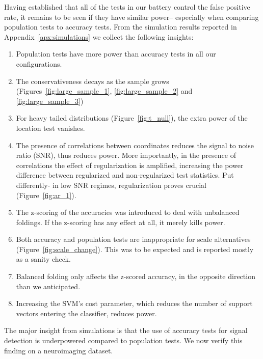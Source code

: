 \documentclass[12pt,a4paper]{article}
\theoremstyle{definition}
\begin{document}
Having established that all of the tests in our battery control the false positive rate, it remains to be seen if they have similar power-- 
especially when comparing population tests to accuracy tests. 
From the simulation results reported in Appendix~\ref{apx:simulations} we collect the following insights:
\begin{enumerate}
\item Population tests have more power than accuracy tests in all our configurations.

\item The conservativeness decays as the sample grows (Figures~\ref{fig:large_sample_1}, \ref{fig:large_sample_2} and \ref{fig:large_sample_3})

\item For heavy tailed distributions (Figure~\ref{fig:t_null}), the extra power of the location test vanishes. 

\item The presence of correlations between coordinates reduces the signal to noise ratio (SNR), thus reduces power. 
More importantly, in the presence of correlations the effect of regularization is amplified, increasing the power difference between regularized and non-regularized test statistics.
Put differently- in low SNR regimes, regularization proves crucial (Figure~\ref{fig:ar_1}).

\item The z-scoring of the accuracies was introduced to deal with unbalanced foldings. 
If the z-scoring has any effect at all, it merely kills power.

\item Both accuracy and population tests are inappropriate for scale alternatives (Figure~\ref{fig:scale_change}). 
This was to be expected and is reported mostly as a sanity check.

\item Balanced folding only affects the z-scored accuracy, in the opposite direction than we anticipated. 

\item Increasing the SVM's cost parameter, which reduces the number of support vectors entering the classifier, reduces power. 

\end{enumerate}


The major insight from simulations is that the use of accuracy tests for signal detection is underpowered compared to population tests. 
We now verify this finding on a neuroimaging dataset.
\end{document}

